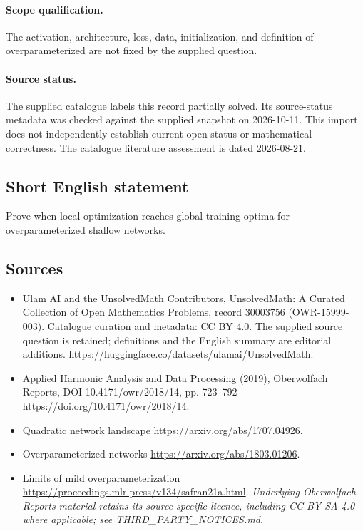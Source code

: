 \documentclass[11pt]{article}
\begin{document}
\paragraph{Scope qualification.}
The activation, architecture, loss, data, initialization, and definition of overparameterized are not fixed by the supplied question.
\paragraph{Source status.}
The supplied catalogue labels this record partially solved. Its source-status metadata was checked against the supplied snapshot on 2026-10-11. This import does not independently establish current open status or mathematical correctness. The catalogue literature assessment is dated 2026-08-21.
\subsection{Short English statement}
Prove when local optimization reaches global training optima for overparameterized shallow networks.
\subsection{Sources}
\begin{itemize}
\item[S1] Ulam AI and the UnsolvedMath Contributors, UnsolvedMath: A Curated Collection of Open Mathematics Problems, record 30003756 (OWR-15999-003). Catalogue curation and metadata: CC BY 4.0. The supplied source question is retained; definitions and the English summary are editorial additions.
\url{https://huggingface.co/datasets/ulamai/UnsolvedMath}.
\item[S2] Applied Harmonic Analysis and Data Processing (2019), Oberwolfach Reports, DOI 10.4171/owr/2018/14, pp. 723--792
\url{https://doi.org/10.4171/owr/2018/14}.
\item[S3] Quadratic network landscape
\url{https://arxiv.org/abs/1707.04926}.
\item[S4] Overparameterized networks
\url{https://arxiv.org/abs/1803.01206}.
\item[S5] Limits of mild overparameterization
\url{https://proceedings.mlr.press/v134/safran21a.html}.
\textit{Underlying Oberwolfach Reports material retains its source-specific licence, including CC BY-SA 4.0 where applicable; see THIRD\_PARTY\_NOTICES.md.}
\end{itemize}
\end{document}
